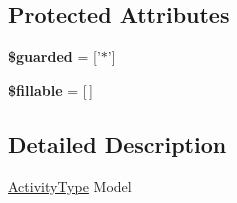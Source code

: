 \subsection*{Protected Attributes}
\begin{DoxyCompactItemize}
\item 
\hypertarget{classDMA_1_1Friends_1_1Models_1_1ActivityType_a8168d7847a4167cf499bf8c95a3fdb17}{{\bfseries \$guarded} = \mbox{[}'$\ast$'\mbox{]}}\label{classDMA_1_1Friends_1_1Models_1_1ActivityType_a8168d7847a4167cf499bf8c95a3fdb17}

\item 
\hypertarget{classDMA_1_1Friends_1_1Models_1_1ActivityType_ac98dbccc38d9f41ab37fb367238a1396}{{\bfseries \$fillable} = \mbox{[}$\,$\mbox{]}}\label{classDMA_1_1Friends_1_1Models_1_1ActivityType_ac98dbccc38d9f41ab37fb367238a1396}

\end{DoxyCompactItemize}


\subsection{Detailed Description}
\hyperlink{classDMA_1_1Friends_1_1Models_1_1ActivityType}{Activity\-Type} Model 

